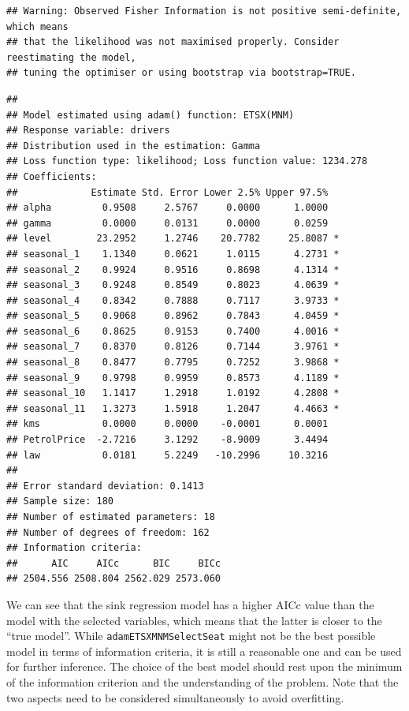 \documentclass[
]{book}
\theoremstyle{definition}
\theoremstyle{definition}
\theoremstyle{definition}
\theoremstyle{definition}
\theoremstyle{remark}
\begin{document}
\begin{verbatim}
## Warning: Observed Fisher Information is not positive semi-definite, which means
## that the likelihood was not maximised properly. Consider reestimating the model,
## tuning the optimiser or using bootstrap via bootstrap=TRUE.
\end{verbatim}

\begin{verbatim}
## 
## Model estimated using adam() function: ETSX(MNM)
## Response variable: drivers
## Distribution used in the estimation: Gamma
## Loss function type: likelihood; Loss function value: 1234.278
## Coefficients:
##             Estimate Std. Error Lower 2.5% Upper 97.5%  
## alpha         0.9508     2.5767     0.0000      1.0000  
## gamma         0.0000     0.0131     0.0000      0.0259  
## level        23.2952     1.2746    20.7782     25.8087 *
## seasonal_1    1.1340     0.0621     1.0115      4.2731 *
## seasonal_2    0.9924     0.9516     0.8698      4.1314 *
## seasonal_3    0.9248     0.8549     0.8023      4.0639 *
## seasonal_4    0.8342     0.7888     0.7117      3.9733 *
## seasonal_5    0.9068     0.8962     0.7843      4.0459 *
## seasonal_6    0.8625     0.9153     0.7400      4.0016 *
## seasonal_7    0.8370     0.8126     0.7144      3.9761 *
## seasonal_8    0.8477     0.7795     0.7252      3.9868 *
## seasonal_9    0.9798     0.9959     0.8573      4.1189 *
## seasonal_10   1.1417     1.2918     1.0192      4.2808 *
## seasonal_11   1.3273     1.5918     1.2047      4.4663 *
## kms           0.0000     0.0000    -0.0001      0.0001  
## PetrolPrice  -2.7216     3.1292    -8.9009      3.4494  
## law           0.0181     5.2249   -10.2996     10.3216  
## 
## Error standard deviation: 0.1413
## Sample size: 180
## Number of estimated parameters: 18
## Number of degrees of freedom: 162
## Information criteria:
##      AIC     AICc      BIC     BICc 
## 2504.556 2508.804 2562.029 2573.060
\end{verbatim}

We can see that the sink regression model has a higher AICc value than the model with the selected variables, which means that the latter is closer to the ``true model''. While \texttt{adamETSXMNMSelectSeat} might not be the best possible model in terms of information criteria, it is still a reasonable one and can be used for further inference. The choice of the best model should rest upon the minimum of the information criterion and the understanding of the problem. Note that the two aspects need to be considered simultaneously to avoid overfitting.
\end{document}
